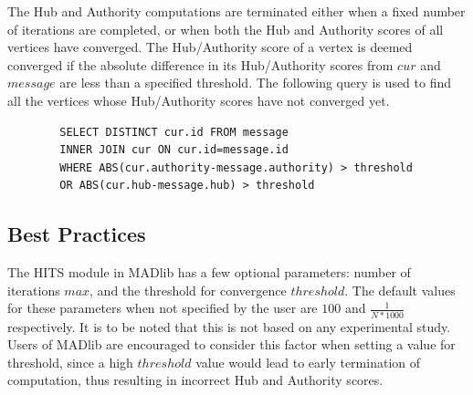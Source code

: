 The Hub and Authority computations are terminated either when a fixed number of
iterations are completed, or when both the Hub and Authority scores of all
vertices have converged. The Hub/Authority score of a vertex is deemed
converged if the absolute difference in its Hub/Authority scores from $cur$ and
$message$ are less than a specified threshold.
The following query is used to find all the vertices whose Hub/Authority scores
have not converged yet.
\begin{algorithm}
\label{alg:hits:update1}
\begin{lstlisting}
		SELECT DISTINCT cur.id FROM message
		INNER JOIN cur ON cur.id=message.id
		WHERE ABS(cur.authority-message.authority) > threshold
		OR ABS(cur.hub-message.hub) > threshold
\end{lstlisting}
\end{algorithm}

\subsection{Best Practices} \label{sec:hits:bestpractices}

The HITS module in MADlib has a few optional parameters: number of iterations $max$,
and the threshold for convergence $threshold$.
The default values for these parameters when not specified by the user are $100$
and $\frac{1}{N*1000}$ respectively.
It is to be noted that this is not based on any experimental study. Users of
MADlib are encouraged to consider this factor when setting a value for threshold,
since a high $threshold$ value would lead to early termination of computation,
thus resulting in incorrect Hub and Authority scores.
